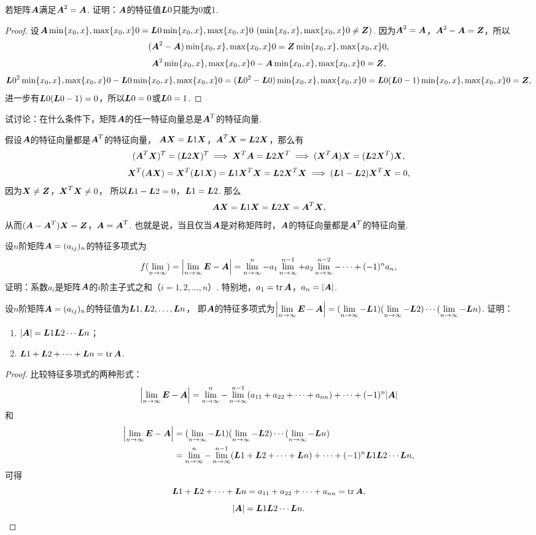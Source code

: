 \begin{example}
若矩阵\(\A\)满足\(\A^2=\A\).
证明：\(\A\)的特征值\(\L0\)只能为0或1.
\begin{proof}
设\(\A\X0=\L0\X0\ (\X0\neq\z)\).
因为\(\A^2=\A\)，\(\A^2-\A=\z\)，所以\[
	(\A^2-\A)\X0=\z\X0,
\]\[
	\A^2\X0-\A\X0=\z,
\]\[
	\L0^2\X0-\L0\X0=(\L0^2-\L0)\X0=\L0(\L0-1)\X0=\z,
\]
进一步有\(\L0(\L0-1)=0\)，所以\(\L0=0\)或\(\L0=1\).
\end{proof}
\end{example}

\begin{example}
试讨论：在什么条件下，矩阵\(\A\)的任一特征向量总是\(\A^T\)的特征向量.
\begin{solution}
假设\(\A\)的特征向量都是\(\A^T\)的特征向量，
\(\A\x=\L{1}\x\)，\(\A^T\x=\L{2}\x\)，那么有\[
	(\A^T\x)^T=(\L{2}\x)^T
	\implies
	\x^T\A=\L{2}\x^T
	\implies
	(\x^T\A)\x=(\L{2}\x^T)\x,
\]\[
	\x^T(\A\x)=\x^T(\L{1}\x)=\L{1}\x^T\x=\L{2}\x^T\x
	\implies
	(\L{1}-\L{2})\x^T\x=0,
\]
因为\(\x\neq\z\)，\(\x^T\x\neq0\)，
所以\(\L{1}-\L{2}=0\)，\(\L{1}=\L{2}\).
那么\[
	\A\x=\L{1}\x=\L{2}\x=\A^T\x,
\]
从而\((\A-\A^T)\x=\z\)，\(\A=\A^T\).
也就是说，当且仅当\(\A\)是对称矩阵时，\(\A\)的特征向量都是\(\A^T\)的特征向量.
\end{solution}
\end{example}

\begin{example}
设\(n\)阶矩阵\(\A=(a_{ij})_n\)的特征多项式为\[
	f(\l) = \abs{\l\E-\A}
	= \l^n - a_1 \l^{n-1} + a_2 \l^{n-2} - \dotsb + (-1)^n a_n,
\]
证明：系数\(a_i\)是矩阵\(\A\)的\(i\)阶主子式之和（\(i=1,2,\dotsc,n\)）.
特别地，\(a_1 = \tr\A\)，\(a_n = \abs{\A}\).
\end{example}

\begin{example}
设\(n\)阶矩阵\(\A=(a_{ij})_n\)的特征值为\(\L{1},\L{2},\dotsc,\L{n}\)，
即\(\A\)的特征多项式为\(\abs{\l\E-\A}=(\l-\L{1})(\l-\L{2})\dotsm(\l-\L{n})\).
证明：
\begin{enumerate}
	\item \(\abs{\A} = \L{1} \L{2} \dotsm \L{n}\)；
	\item \(\L{1} + \L{2} + \dotsb + \L{n} = \tr\A\).
\end{enumerate}
\begin{proof}
比较特征多项式的两种形式：\[
	\abs{\l\E-\A}
	=\l^n-\l^{n-1}(a_{11}+a_{22}+ \dotsb +a_{nn})+ \dotsb +(-1)^n\abs{\A}
\]
和\begin{align*}
	\abs{\l\E-\A} &= (\l-\L{1})(\l-\L{2})\dotsm(\l-\L{n}) \\
	&= \l^n-\l^{n-1}(\L{1}+\L{2}+ \dotsb +\L{n}) + \dotsb + (-1)^n \L{1} \L{2} \dotsm \L{n},
\end{align*}
可得\[
	\L{1} + \L{2} + \dotsb + \L{n} = a_{11} + a_{22} + \dotsb + a_{nn} = \tr\A,
\]\[
	\abs{\A} = \L{1} \L{2} \dotsm \L{n}.
	\qedhere
\]
\end{proof}
\end{example}

